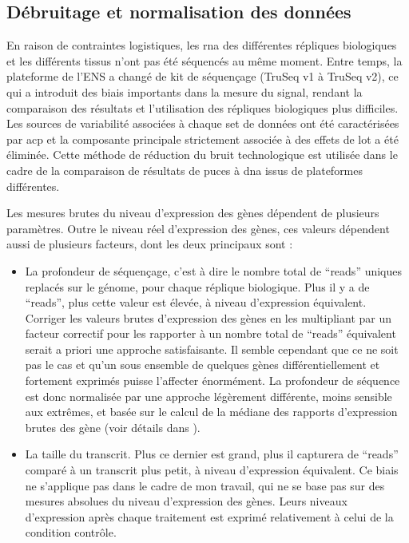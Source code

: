 \documentclass[../main.tex]{subfiles}
\begin{document}
	\subsection{Débruitage et normalisation des données}
		En raison de contraintes logistiques, les \gls{rna} des différentes répliques biologiques et les différents tissus n'ont pas été séquencés au même moment.
		Entre temps, la plateforme de l'ENS a changé de kit de séquençage (TruSeq v1 à TruSeq v2), ce qui a introduit des biais importants dans la mesure du signal, rendant la comparaison des résultats et l'utilisation des répliques biologiques plus difficiles.
		Les sources de variabilité associées à chaque set de données ont été caractérisées par \gls{acp} et la composante principale strictement associée à des effets de lot a été éliminée.
		Cette méthode de réduction du bruit technologique est utilisée dans le cadre de la comparaison de résultats de puces à \gls{dna} issus de plateformes différentes.
		\par
		Les mesures brutes du niveau d'expression des gènes dépendent de plusieurs paramètres.
		Outre le niveau réel d'expression des gènes, ces valeurs dépendent aussi de plusieurs facteurs, dont les deux principaux sont :
		\begin{itemize}
			\item
				La profondeur de séquençage, c'est à dire le nombre total de ``reads'' uniques replacés sur le génome, pour chaque réplique biologique.
				Plus il y a de ``reads'', plus cette valeur est élevée, à niveau d'expression équivalent. Corriger les valeurs brutes d'expression des gènes en les multipliant par un facteur correctif pour les rapporter à un nombre total de ``reads'' équivalent serait a priori une approche satisfaisante.
				Il semble cependant que ce ne soit pas le cas et qu'un sous ensemble de quelques gènes différentiellement et fortement exprimés puisse l'affecter énormément.
				La profondeur de séquence est donc normalisée par une approche légèrement différente, moins sensible aux extrêmes, et basée sur le calcul de la médiane des rapports d'expression brutes des gène (voir détails dans \citealp{Anders2010}).
			\item
				La taille du transcrit. Plus ce dernier est grand, plus il capturera de ``reads'' comparé à un transcrit plus petit, à niveau d'expression équivalent.
				Ce biais ne s'applique pas dans le cadre de mon travail, qui ne se base pas sur des mesures absolues du niveau d'expression des gènes.
				Leurs niveaux d'expression après chaque traitement est exprimé relativement à celui de la condition contrôle.
		\end{itemize}
\end{document}
